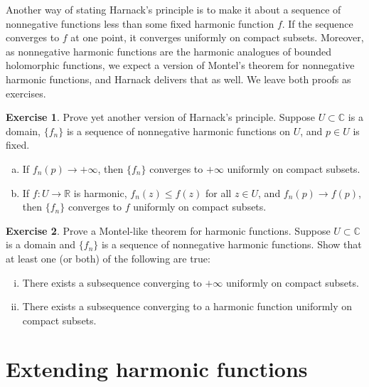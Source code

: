 \documentclass[12pt,openany]{book}
\newcommand{\C}{{\mathbb{C}}}
\newcommand{\R}{{\mathbb{R}}}
\theoremstyle{plain}
\theoremstyle{remark}
\theoremstyle{definition}
\newenvironment{exbox}{%
    \def\FrameCommand{\vrule width 1pt \relax\hspace{10pt}}%
    \MakeFramed{\advance\hsize-\width\FrameRestore}%
}{%
    \endMakeFramed
}
\newenvironment{exparts}{%
    \leavevmode\begin{enumerate}[a),noitemsep,topsep=0pt,parsep=0pt,partopsep=0pt]
}{%
    \end{enumerate}
}
\theoremstyle{exercise}
\newtheorem{exercise}{Exercise}[section]
\theoremstyle{example}
\begin{document}
Another way of stating Harnack's principle is to make it about
a sequence of nonnegative functions less
than some fixed harmonic function $f$.  If the sequence converges to $f$ at
one point, it converges uniformly on compact subsets.  Moreover, as
nonnegative harmonic functions are the harmonic analogues of bounded holomorphic
functions, we expect a version of Montel's theorem for nonnegative harmonic
functions, and Harnack delivers that as well.  We leave both proofs as
exercises.

\begin{exbox}
\begin{exercise}
Prove yet another version of Harnack's principle.
Suppose $U \subset \C$ is a domain,
$\{ f_n \}$ is a sequence of nonnegative harmonic functions on
$U$, and $p \in U$ is fixed.
\begin{exparts}
\item
If $f_n(p) \to +\infty$, then $\{ f_n \}$ converges to $+\infty$ uniformly on
compact subsets.
\item
If $f \colon U \to \R$ is harmonic, $f_n(z) \leq f(z)$ for all $z \in U$,
and $f_n(p) \to f(p)$, then $\{ f_n \}$ converges to $f$ uniformly on
compact subsets.
\end{exparts}
\end{exercise}

\begin{exercise}
Prove a Montel-like theorem for harmonic functions.  Suppose $U \subset \C$
is a domain and $\{ f_n \}$ is a sequence of nonnegative harmonic functions.
Show that at least one (or both) of the following are true:
\begin{enumerate}[(i)]
\item
There exists a subsequence converging to $+\infty$ uniformly on compact subsets.
\item
There exists a subsequence converging to a harmonic function
uniformly on compact subsets.
\end{enumerate}
\end{exercise}
\end{exbox}



\section{Extending harmonic functions}
\end{document}
